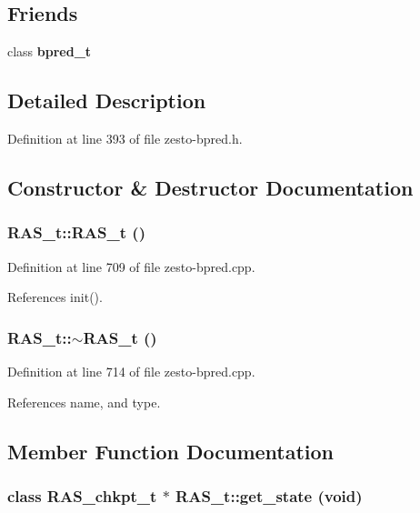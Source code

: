\subsection*{Friends}
\begin{CompactItemize}
\item 
class {\bf bpred\_\-t}
\end{CompactItemize}


\subsection{Detailed Description}


Definition at line 393 of file zesto-bpred.h.

\subsection{Constructor \& Destructor Documentation}
\subsubsection[{RAS\_\-t}]{\setlength{\rightskip}{0pt plus 5cm}RAS\_\-t::RAS\_\-t ()}\label{classRAS__t_7684b42f305e1236f149a0d2a5eaebea}




Definition at line 709 of file zesto-bpred.cpp.

References init().
\subsubsection[{$\sim$RAS\_\-t}]{\setlength{\rightskip}{0pt plus 5cm}RAS\_\-t::$\sim$RAS\_\-t ()\hspace{0.3cm}{\tt  [virtual]}}\label{classRAS__t_3d2e8b0f1768f640d1a8a83b17e05ef0}




Definition at line 714 of file zesto-bpred.cpp.

References name, and type.

\subsection{Member Function Documentation}
\subsubsection[{get\_\-state}]{\setlength{\rightskip}{0pt plus 5cm}class {\bf RAS\_\-chkpt\_\-t} $\ast$ RAS\_\-t::get\_\-state (void)\hspace{0.3cm}{\tt  [virtual]}}\label{classRAS__t_59bd61821697c014ac040ded2153cfcd}




